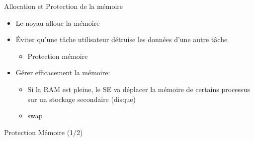 \documentclass[11pt]{beamer}
\begin{document}
\begin{frame}{Allocation et Protection de la mémoire}

\begin{itemize}
\itemsep1pt\parskip0pt
\item
  Le noyau alloue la mémoire
\item
  Éviter qu'une tâche utilisateur détruise les données d'une autre tâche

  \begin{itemize}
  \itemsep1pt\parskip0pt
  \item
    Protection mémoire
  \end{itemize}
\item
  Gérer efficacement la mémoire:

  \begin{itemize}
  \itemsep1pt\parskip0pt
  \item
    Si la RAM est pleine, le SE va déplacer la mémoire de certains
    processus sur un stockage secondaire (disque)
  \item
    swap
  \end{itemize}
\end{itemize}

\end{frame}


\begin{slide}{Protection Mémoire (1/2)}
\end{slide}
\end{document}
